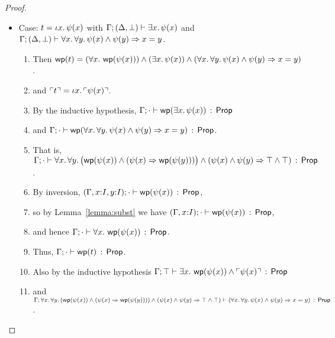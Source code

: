 \documentclass[10pt,a4paper]{article}
\begin{document}
\begin{proof}
\begin{itemize}
  \goodbreak
    
  \item Case: $t = \iota x.\, \psi(x)$ with
  $\Gamma;(\Delta,\bot) \vdash \exists x.\, \psi(x)$ and 
  $\Gamma;(\Delta,\bot) \vdash \forall x.\, \forall y.\, \psi(x) \wedge \psi(y) \Rightarrow x=y$.

    \begin{enumerate}
      \item 
        Then
        $\mathop{\mathsf{wp}}(t) = 
        (\forall x.\, \mathop{\mathsf{wp}}(\psi(x))) \wedge (\exists x.\, \psi(x)) \wedge (\forall x.\, \forall y.\, \psi(x) \wedge \psi(y) \Rightarrow x=y)$.
      \item
        and 
        	$\ulcorner t \urcorner = \iota x.\, \ulcorner \psi(x) \urcorner$.
      \item 
        By the inductive hypothesis, $\Gamma;\cdot \vdash \mathop{\mathsf{wp}}(\exists x.\, \psi(x))\, :\, \mathsf{Prop}$
      \item 
      	and
        $\Gamma;\cdot \vdash \mathop{\mathsf{wp}}(\forall x.\, \forall y.\, \psi(x) \wedge \psi(y) \Rightarrow x=y)\, :\, \mathsf{Prop}$.
      \item
      	That is, 
	$\Gamma;\cdot \vdash \forall x.\, \forall y.\, \bigl(\mathop{\mathsf{wp}}(\psi(x)) \wedge (\psi(x) \Rightarrow \mathop{\mathsf{wp}}(\psi(y)))\bigr) \wedge (\psi(x) \wedge \psi(y) \Rightarrow \top \wedge \top)\, :\, \mathsf{Prop}$.
	  \item
	    By inversion, 
	      $(\Gamma,x{:}I,y{:}I);\cdot \vdash \mathop{\mathsf{wp}}(\psi(x))\, :\, \mathsf{Prop}$,
      \item 
        so by Lemma~\ref{lemma:subst} we have 
        $(\Gamma,x{:}I);\cdot \vdash \mathop{\mathsf{wp}}(\psi(x))\, :\, \mathsf{Prop}$,
      \item
        and hence $\Gamma;\cdot \vdash \forall x.\, \mathop{\mathsf{wp}}(\psi(x))\, :\, \mathsf{Prop}$.
      \item
        Thus, $\Gamma;\cdot \vdash \mathop{\mathsf{wp}}(t)\, :\, \mathsf{Prop}$.
      \item
        Also by the inductive hypothesis
        $\Gamma;\top \vdash \exists x.\, \mathop{\mathsf{wp}}(\psi(x)) \wedge \ulcorner \psi(x) \urcorner\, :\, \mathsf{Prop}$
      \item
        and 
        $\Gamma;\forall x.\, \forall y.\, (\mathop{\mathsf{wp}}(\psi(x)) \wedge (\psi(x) \Rightarrow \mathop{\mathsf{wp}}(\psi(y)))) \wedge (\psi(x) \wedge \psi(y) \Rightarrow \top \wedge \top) \vdash (\forall x.\, \forall y.\, \psi(x) \wedge \psi(y) \Rightarrow x=y)\, :\, \mathsf{Prop}$.
      \end{enumerate}
      

\end{itemize}
\end{proof}
\end{document}
